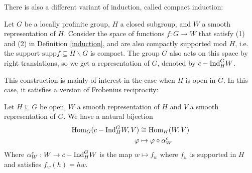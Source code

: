 There is also a different variant of induction, called compact induction:
\begin{defn}
	Let $G$ be a locally profinite group, $H$ a closed subgroup, and $W$ a smooth representation of $H$. Consider the space of functions $f: G\to W$ that satisfy (1) and (2) in Definition \ref{induction}, and are also compactly supported mod $H$, i.e. the support $\mathrm{supp} f\subseteq H\backslash G$ is compact. The group $G$ also acts on this space by right translations, so we get a representation of $G$, denoted by $c-\mathrm{Ind}_H^G W$.
\end{defn}
This construction is mainly of interest in the case when $H$ is open in $G$. In this case, it satisfies a version of Frobenius reciprocity:
\begin{thm}
	Let $H\subseteq G$ be open, $W$ a smooth representation of $H$ and $V$ a smooth representation of $G$. We have a natural bijection
	\begin{align*}
		\mathrm{Hom}_G(c-\mathrm{Ind}_H^G W, V)&\cong \mathrm{Hom}_H(W, V)\\
		\varphi &\mapsto \varphi \circ \alpha^c_W 
	\end{align*}
	Where $\alpha^c_W: W\to c-\mathrm{Ind}_H^G W$ is the map $w\mapsto f_w$ where $f_w$ is supported in $H$ and satisfies $f_w(h) = hw$.
\end{thm}